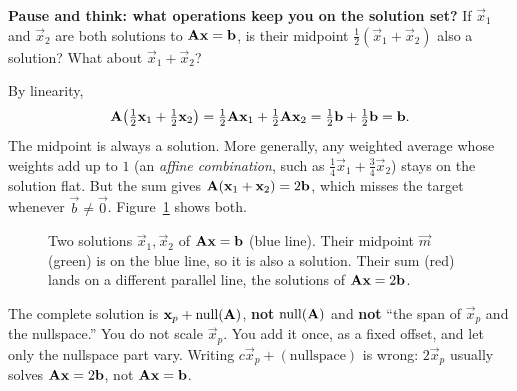 \begin{recoverybox}
\textbf{Pause and think: what operations keep you on the solution set?}
If $\vec{x}_1$ and $\vec{x}_2$ are both solutions to $\mathbf{A}\mathbf{x}=\mathbf{b}$, is their
midpoint $\frac{1}{2}(\vec{x}_1+\vec{x}_2)$ also a solution? What about $\vec{x}_1+\vec{x}_2$?

By linearity,
\[
  \mathbf{A}\bigl(\tfrac{1}{2}\mathbf{x}_1+\tfrac{1}{2}\mathbf{x}_2\bigr)
  = \tfrac{1}{2}\mathbf{A}\mathbf{x}_1 + \tfrac{1}{2}\mathbf{A}\mathbf{x}_2
  = \tfrac{1}{2}\mathbf{b} + \tfrac{1}{2}\mathbf{b} = \mathbf{b}.
\]
The midpoint is always a solution. More generally, any weighted average whose weights
add up to $1$ (an \emph{affine combination}, such as $\tfrac14\vec{x}_1+\tfrac34\vec{x}_2$)
stays on the solution flat. But the sum gives
$\mathbf{A}(\mathbf{x}_1+\mathbf{x}_2)=2\mathbf{b}$, which misses the target whenever
$\vec{b}\neq\vec{0}$. Figure~\ref{ch13:midpoint} shows both.
\end{recoverybox}

\begin{figure}[htbp]
\centering
{}
\caption{Two solutions $\vec x_1,\vec x_2$ of $\mathbf{A}\mathbf{x}=\mathbf{b}$ (blue line). Their
midpoint $\vec m$ (green) is on the blue line, so it is also a solution. Their sum (red) lands on a
different parallel line, the solutions of $\mathbf{A}\mathbf{x}=2\mathbf{b}$.}
\label{ch13:midpoint}
\end{figure}

\begin{trapbox}
The complete solution is $\mathbf{x}_p+\operatorname{null}(\mathbf{A})$, \textbf{not} $\operatorname{null}(\mathbf{A})$ and
\textbf{not} ``the span of $\vec{x}_p$ and the nullspace.'' You do not scale $\vec{x}_p$.
You add it once, as a fixed offset, and let only the nullspace part vary. Writing
$c\vec{x}_p+(\text{nullspace})$ is wrong: $2\vec{x}_p$ usually solves
$\mathbf{A}\mathbf{x}=2\mathbf{b}$, not $\mathbf{A}\mathbf{x}=\mathbf{b}$.
\end{trapbox}


